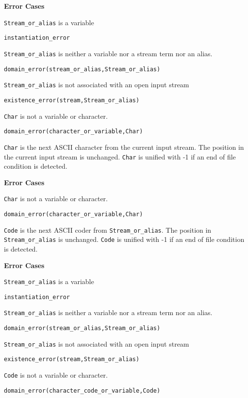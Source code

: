 \begin{description}
{\bf Error Cases}
\bi
\item 	{\tt Stream\_or\_alias} is a variable
\bi
\item {\tt instantiation\_error}
\ei
\item 	{\tt Stream\_or\_alias} is neither a variable nor a stream term nor an alias.
\bi
\item 	{\tt domain\_error(stream\_or\_alias,Stream\_or\_alias)}
\ei
\item 	{\tt Stream\_or\_alias} is not associated with an open input stream
\bi
\item 	{\tt existence\_error(stream,Stream\_or\_alias)}
\ei
\item 	{\tt Char} is not a variable or character.
\bi
\item 	{\tt domain\_error(character\_or\_variable,Char)}
\ei
\ei

%
{\tt Char} is the next ASCII character from the current input stream.
The position in the current input stream is unchanged.  {\tt Char} is
unified with -1 if an end of file condition is detected.

{\bf Error Cases}
\bi
\item 	{\tt Char} is not a variable or character.
\bi
\item 	{\tt domain\_error(character\_or\_variable,Char)}
\ei
\ei

%
{\tt Code} is the next ASCII coder from {\tt Stream\_or\_alias}.
The position in {\tt Stream\_or\_alias} is unchanged.  {\tt Code} is
unified with -1 if an end of file condition is detected.

{\bf Error Cases}
\bi
\item 	{\tt Stream\_or\_alias} is a variable
\bi
\item {\tt instantiation\_error}
\ei
\item 	{\tt Stream\_or\_alias} is neither a variable nor a stream term nor an alias.
\bi
\item 	{\tt domain\_error(stream\_or\_alias,Stream\_or\_alias)}
\ei
\item 	{\tt Stream\_or\_alias} is not associated with an open input stream
\bi
\item 	{\tt existence\_error(stream,Stream\_or\_alias)}
\ei
\item 	{\tt Code} is not a variable or character.
\bi
\item 	{\tt domain\_error(character\_code\_or\_variable,Code)}
\ei
\ei


\end{description}
